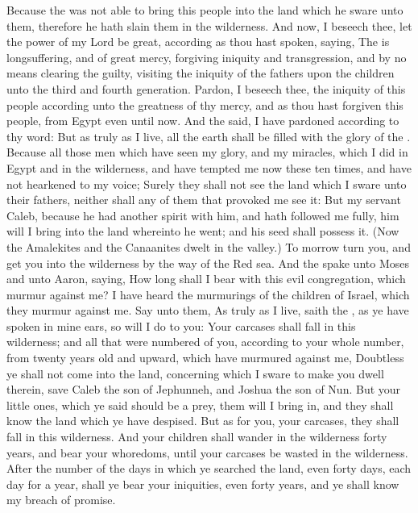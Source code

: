 \begin{biblechapter}
\verse Because the \LORD was not able to bring this people into the land which he sware unto them, therefore he hath slain them in the wilderness.
\verse And now, I beseech thee, let the power of my Lord be great, according as thou hast spoken, saying,
\verse The \LORD is longsuffering, and of great mercy, forgiving iniquity and transgression, and by no means clearing the guilty, visiting the iniquity of the fathers upon the children unto the third and fourth generation.
\verse Pardon, I beseech thee, the iniquity of this people according unto the greatness of thy mercy, and as thou hast forgiven this people, from Egypt even until now.
\verse And the \LORD said, I have pardoned according to thy word:
\verse But as truly as I live, all the earth shall be filled with the glory of the \LORD.
\verse Because all those men which have seen my glory, and my miracles, which I did in Egypt and in the wilderness, and have tempted me now these ten times, and have not hearkened to my voice;
\verse Surely they shall not see the land which I sware unto their fathers, neither shall any of them that provoked me see it:
\verse But my servant Caleb, because he had another spirit with him, and hath followed me fully, him will I bring into the land whereinto he went; and his seed shall possess it.
\verse (Now the Amalekites and the Canaanites dwelt in the valley.) To morrow turn you, and get you into the wilderness by the way of the Red sea.
\verse And the \LORD spake unto Moses and unto Aaron, saying,
\verse How long shall I bear with this evil congregation, which murmur against me? I have heard the murmurings of the children of Israel, which they murmur against me.
\verse Say unto them, As truly as I live, saith the \LORD, as ye have spoken in mine ears, so will I do to you:
\verse Your carcases shall fall in this wilderness; and all that were numbered of you, according to your whole number, from twenty years old and upward, which have murmured against me,
\verse Doubtless ye shall not come into the land, concerning which I sware to make you dwell therein, save Caleb the son of Jephunneh, and Joshua the son of Nun.
\verse But your little ones, which ye said should be a prey, them will I bring in, and they shall know the land which ye have despised.
\verse But as for you, your carcases, they shall fall in this wilderness.
\verse And your children shall wander in the wilderness forty years, and bear your whoredoms, until your carcases be wasted in the wilderness.
\verse After the number of the days in which ye searched the land, even forty days, each day for a year, shall ye bear your iniquities, even forty years, and ye shall know my breach of promise.

\end{biblechapter}

